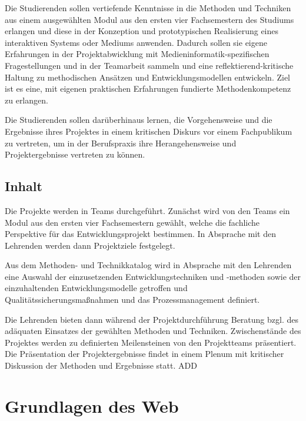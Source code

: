 Die Studierenden sollen vertiefende Kenntnisse in die Methoden und
Techniken aus einem ausgewählten Modul aus den ersten vier Fachsemestern
des Studiums erlangen und diese in der Konzeption und prototypischen
Realisierung eines interaktiven Systems oder Mediums anwenden. Dadurch
sollen sie eigene Erfahrungen in der Projektabwicklung mit
Medieninformatik-spezifischen Fragestellungen und in der Teamarbeit
sammeln und eine reflektierend-kritische Haltung zu methodischen
Ansätzen und Entwicklungsmodellen entwickeln. Ziel ist es eine, mit
eigenen praktischen Erfahrungen fundierte Methodenkompetenz zu erlangen.

Die Studierenden sollen darüberhinaus lernen, die Vorgehensweise und die
Ergebnisse ihres Projektes in einem kritischen Diskurs vor einem
Fachpublikum zu vertreten, um in der Berufspraxis ihre Herangehensweise
und Projektergebnisse vertreten zu können.

\hypertarget{inhaltpathlabelmi-2017modulbeschreibungen-bachelorba_entwicklungsprojekt}{%
\section*{Inhalt\label{/mi-2017/modulbeschreibungen-bachelor/BA_Entwicklungsprojekt}}\label{inhaltpathlabelmi-2017modulbeschreibungen-bachelorba_entwicklungsprojekt}}

Die Projekte werden in Teams durchgeführt. Zunächst wird von den Teams
ein Modul aus den ersten vier Fachsemestern gewählt, welche die
fachliche Perspektive für das Entwicklungsprojekt bestimmen. In
Absprache mit den Lehrenden werden dann Projektziele festgelegt.

Aus dem Methoden- und Technikkatalog wird in Absprache mit den Lehrenden
eine Auswahl der einzusetzenden Entwicklungstechniken und -methoden
sowie der einzuhaltenden Entwicklungsmodelle getroffen und
Qualitätssicherungsmaßnahmen und das Prozessmanagement definiert.

Die Lehrenden bieten dann während der Projektdurchführung Beratung bzgl.
des adäquaten Einsatzes der gewählten Methoden und Techniken.
Zwischenstände des Projektes werden zu definierten Meilensteinen von den
Projektteams präsentiert. Die Präsentation der Projektergebnisse findet
in einem Plenum mit kritischer Diskussion der Methoden und Ergebnisse
statt. ADD

\hypertarget{grundlagen-des-webpathlabelmi-2017modulbeschreibungen-bachelorba_grundlagen-des-web}{%
\chapter{Grundlagen des
Web\label{/mi-2017/modulbeschreibungen-bachelor/BA_Grundlagen-des-web}}\label{grundlagen-des-webpathlabelmi-2017modulbeschreibungen-bachelorba_grundlagen-des-web}}

